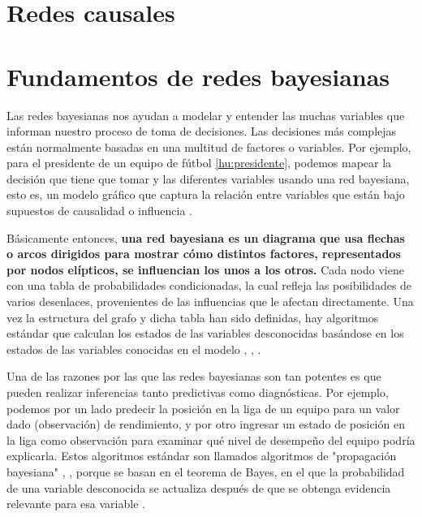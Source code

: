 \section{Redes causales}

\section{Fundamentos de redes bayesianas}
Las redes bayesianas nos ayudan a modelar y entender las muchas variables que informan nuestro proceso de 
toma de decisiones. Las decisiones más complejas están normalmente basadas en una multitud de factores o 
variables. Por ejemplo, para el presidente de un equipo de fútbol \ref{hu:presidente}, podemos 
mapear la decisión que tiene que tomar y las diferentes variables usando 
una red bayesiana, esto es, un modelo gráfico que captura la relación entre variables que están bajo 
supuestos de causalidad o influencia \cite{things-to-know-BN}.

Básicamente entonces, \textbf{una red bayesiana es un diagrama que 
usa flechas o arcos dirigidos para mostrar cómo distintos factores, representados por nodos elípticos, se 
influencian los unos a los otros.} Cada nodo viene con una tabla de probabilidades condicionadas, la cual refleja las 
posibilidades de varios desenlaces, provenientes de las influencias que le afectan directamente. Una vez 
la estructura del grafo y dicha tabla han sido definidas, hay algoritmos estándar que 
calculan los estados de las variables desconocidas basándose en los estados de las variables conocidas en el
modelo \cite{learning-algorithms-BN-comparison}, \cite{BN-achilles-heel}, \cite{different-algorithmic-schemes}.

Una de las razones por las que las redes bayesianas son tan potentes es que pueden realizar inferencias 
tanto predictivas como diagnósticas. Por ejemplo, podemos por un lado predecir la posición en la liga de un equipo para 
un valor dado (observación) de rendimiento, y por otro ingresar un estado de posición en la 
liga como observación para examinar qué nivel de desempeño del equipo podría explicarla. Estos algoritmos estándar son
llamados algoritmos de "propagación bayesiana" \cite{Cano2004}, \cite{more-algorithms}, \cite{back-prop} porque se basan en el teorema de Bayes, en el que la 
probabilidad de una variable desconocida se actualiza después de que se obtenga evidencia relevante para esa variable \cite{prop-alg}.


